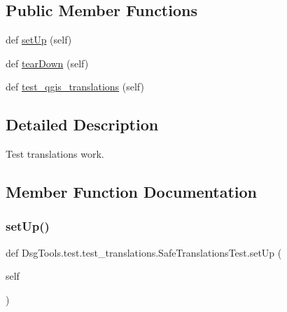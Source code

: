 \subsection*{Public Member Functions}
\begin{DoxyCompactItemize}
\item 
def \mbox{\hyperlink{class_dsg_tools_1_1test_1_1test__translations_1_1_safe_translations_test_a20980ce00c68daea8bfcdd5667d33242}{set\+Up}} (self)
\item 
def \mbox{\hyperlink{class_dsg_tools_1_1test_1_1test__translations_1_1_safe_translations_test_aba80de2e29393a2ea2367d4424423b8c}{tear\+Down}} (self)
\item 
def \mbox{\hyperlink{class_dsg_tools_1_1test_1_1test__translations_1_1_safe_translations_test_a528b04179da3a37e98a0df8d1106d019}{test\+\_\+qgis\+\_\+translations}} (self)
\end{DoxyCompactItemize}


\subsection{Detailed Description}
\begin{DoxyVerb}Test translations work.\end{DoxyVerb}
 

\subsection{Member Function Documentation}
\mbox{\label{class_dsg_tools_1_1test_1_1test__translations_1_1_safe_translations_test_a20980ce00c68daea8bfcdd5667d33242}} 
\subsubsection{\texorpdfstring{set\+Up()}{setUp()}}
{\footnotesize\ttfamily def Dsg\+Tools.\+test.\+test\+\_\+translations.\+Safe\+Translations\+Test.\+set\+Up (\begin{DoxyParamCaption}\item[{}]{self }\end{DoxyParamCaption})}

